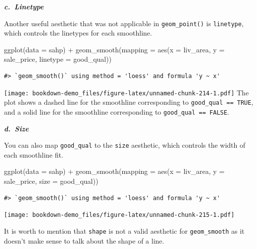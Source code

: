 \documentclass[
]{book}
\newenvironment{Shaded}{\begin{snugshade}}{\end{snugshade}}
\newcommand{\AttributeTok}[1]{\textcolor[rgb]{0.77,0.63,0.00}{#1}}
\newcommand{\FunctionTok}[1]{\textcolor[rgb]{0.00,0.00,0.00}{#1}}
\newcommand{\NormalTok}[1]{#1}
\newcommand{\SpecialCharTok}[1]{\textcolor[rgb]{0.00,0.00,0.00}{#1}}
\begin{document}
\textbf{\emph{c.~Linetype}}

Another useful aesthetic that was not applicable in \texttt{geom\_point()} is \texttt{linetype}, which controls the linetypes for each smoothline.

\begin{Shaded}
\begin{Highlighting}[]
\FunctionTok{ggplot}\NormalTok{(}\AttributeTok{data =}\NormalTok{ sahp) }\SpecialCharTok{+} \FunctionTok{geom\_smooth}\NormalTok{(}\AttributeTok{mapping =} \FunctionTok{aes}\NormalTok{(}\AttributeTok{x =}\NormalTok{ liv\_area, }\AttributeTok{y =}\NormalTok{ sale\_price, }\AttributeTok{linetype =}\NormalTok{ good\_qual))}
\end{Highlighting}
\end{Shaded}

\begin{verbatim}
#> `geom_smooth()` using method = 'loess' and formula 'y ~ x'
\end{verbatim}

\texttt{[image: bookdown-demo\_files/figure-latex/unnamed-chunk-214-1.pdf]}
The plot shows a dashed line for the smoothline corresponding to \texttt{good\_qual\ ==\ TRUE}, and a solid line for the smoothline corresponding to \texttt{good\_qual\ ==\ FALSE}.

\textbf{\emph{d.~Size}}

You can also map \texttt{good\_qual} to the \texttt{size} aesthetic, which controls the width of each smoothline fit.

\begin{Shaded}
\begin{Highlighting}[]
\FunctionTok{ggplot}\NormalTok{(}\AttributeTok{data =}\NormalTok{ sahp) }\SpecialCharTok{+} \FunctionTok{geom\_smooth}\NormalTok{(}\AttributeTok{mapping =} \FunctionTok{aes}\NormalTok{(}\AttributeTok{x =}\NormalTok{ liv\_area, }\AttributeTok{y =}\NormalTok{ sale\_price, }\AttributeTok{size =}\NormalTok{ good\_qual))}
\end{Highlighting}
\end{Shaded}

\begin{verbatim}
#> `geom_smooth()` using method = 'loess' and formula 'y ~ x'
\end{verbatim}

\texttt{[image: bookdown-demo\_files/figure-latex/unnamed-chunk-215-1.pdf]}

It is worth to mention that \texttt{shape} is not a valid aesthetic for \texttt{geom\_smooth} as it doesn't make sense to talk about the shape of a line.
\end{document}
